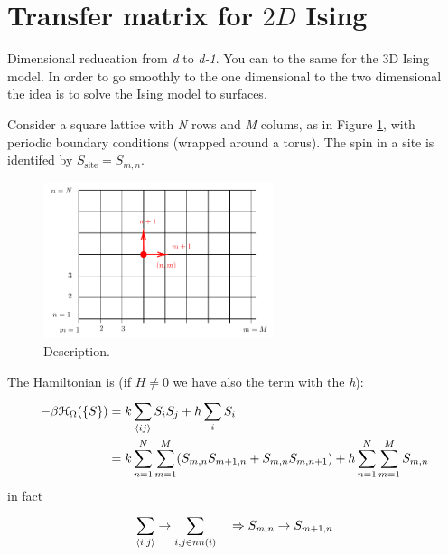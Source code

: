 \documentclass[../main/main.tex]{subfiles}
\begin{document}
\section{Transfer matrix for \( 2D \) Ising}
Dimensional reducation from \emph{d} to \emph{d-1}. You can to the same for the 3D Ising model. In order to go smoothly to the one dimensional to the two dimensional the idea is to solve the Ising model to surfaces.

Consider a square lattice with \emph{N} rows and \emph{M} colums, as in Figure \ref{fig:9_4}, with periodic boundary conditions (wrapped around a torus).
The spin in a site is identifed by \( S_{\text{site}} = S_{m,n} \).
\begin{figure}[h!]
\centering
\includegraphics[width=0.6\textwidth]{../lessons/9_image/4.pdf}
\caption{\label{fig:9_4} Description.}
\end{figure}
The Hamiltonian is (if \( H \neq 0 \) we have also the term with the \emph{h}):
\begin{equation}
\begin{split}
  -\beta \mathcal{H}_ \Omega  ( \{ S \}  ) &= k \sum_{\expval{ij} }^{} S_i S_j + h \sum_{i}^{} S_i  \\
  & = k \sum_{n=1}^{N} \sum_{m=1}^{M} (S_{m,n} S_{m+1,n}+S_{m,n}S_{m,n+1}) + h \sum_{n=1}^{N} \sum_{m=1}^{M} S_{m,n}
\end{split}
\end{equation}
in fact
\begin{equation}
  \sum_{\expval{i,j} }^{}  \rightarrow \sum_{i,j \in nn(i)}^{} \quad \Rightarrow   S_{m,n} \rightarrow S_{m+1,n}
\end{equation}
\end{document}
